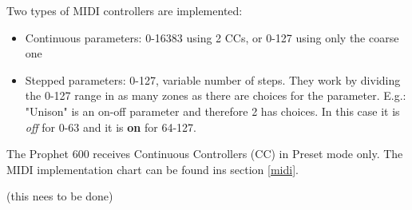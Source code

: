 Two types of MIDI controllers are implemented:

\begin{itemize}
  \setlength\itemsep{0cm}
  \item Continuous parameters: 0-16383 using 2 CCs, or 0-127 using only the coarse one
  \item Stepped parameters: 0-127, variable number of steps. They work by dividing the 0-127 range in as many zones as there are choices for the parameter. E.g.: "Unison" is an on-off parameter and therefore 2 has choices. In this case it is \textit{off} for 0-63 and it is \textbf{on} for 64-127.
\end{itemize}

The Prophet 600 receives Continuous Controllers (CC) in Preset mode only. The MIDI implementation chart can be found ins section \ref{midi}.

(this nees to be done)
